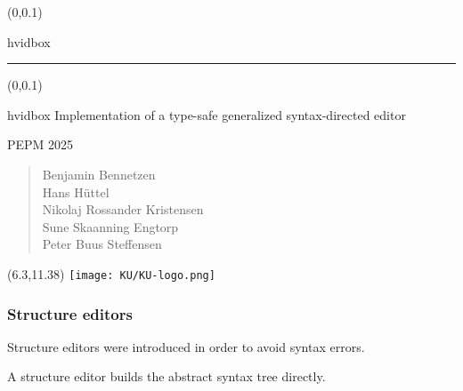 \documentclass[t,24pt,aspectratio=169]{beamer}
\begin{document}
{
\begin{frame}
    \begin{textblock*}{\textwidth}(0\textwidth,0.1\textheight)
        \begin{beamercolorbox}[wd=7.8cm,ht=7.3cm,sep=0.5cm]{hvidbox}
            \fontsize{5}{10}\selectfont {}
            \noindent\textcolor{KUrod}{\rule{6.8cm}{0.4pt}}
        \end{beamercolorbox}
    \end{textblock*}
    \begin{textblock*}{\textwidth}(0\textwidth,0.1\textheight)
        \begin{beamercolorbox}[wd=7.8cm,sep=0.5cm]{hvidbox}
            \Large \textcolor{KUrod}{Implementation of a type-safe
            generalized syntax-directed editor}
            \vspace{0.5cm}
            \par
            \Large PEPM 2025
            \vspace{0.5cm}
            \par
            \normalsize \begin{verse}Benjamin Bennetzen \\
              Hans Hüttel \\
              Nikolaj Rossander Kristensen \\
              Sune Skaanning Engtorp \\
              Peter Buus Steffensen \end{verse}
        \end{beamercolorbox}
    \end{textblock*}
    \begin{textblock}{1}(6.3,11.38)
        \texttt{[image: KU/KU-logo.png]}
    \end{textblock}
\end{frame}
}

\begin{frame}[hvid]
    \frametitle{Structure editors}

    Structure editors were introduced in order to avoid syntax errors.

    A structure editor builds the abstract syntax tree directly.
    
\end{frame}
\end{document}
